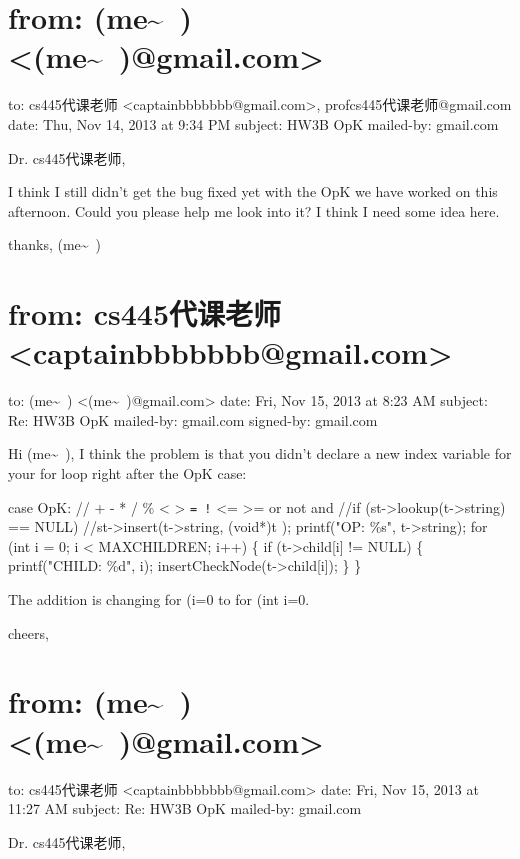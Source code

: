 \documentclass[12pt]{book}
\begin{document}
\section{from:         (me\textasciitilde{}~) <(me\textasciitilde{}~)@gmail.com>}
\label{sec-29-1}
to:         cs445代课老师 <captainbbbbbbb@gmail.com>,
 profcs445代课老师@gmail.com
date:         Thu, Nov 14, 2013 at 9:34 PM
subject:         HW3B OpK
mailed-by:         gmail.com

Dr. cs445代课老师, 

I think I still didn't get the bug fixed yet with the OpK we have worked on this afternoon. 
Could you please help me look into it? I think I need some idea here. 

thanks,
(me\textasciitilde{}~)

\section{from:         cs445代课老师 <captainbbbbbbb@gmail.com>}
\label{sec-29-2}
to:         (me\textasciitilde{}~) <(me\textasciitilde{}~)@gmail.com>
date:         Fri, Nov 15, 2013 at 8:23 AM
subject:         Re: HW3B OpK
mailed-by:         gmail.com
signed-by:         gmail.com

Hi (me\textasciitilde{}~),
             I think the problem is that you didn't declare a new index variable for your for loop 
right after the OpK case:

case OpK:  // + - * / \% < > \texttt{= !} <= >= or not and
            //if (st->lookup(t->string) == NULL)
            //st->insert(t->string, (void*)t );
            printf("OP: \%s\n", t->string);
            for (int i = 0; i < MAXCHILDREN; i++) \{
                if (t->child[i] != NULL) \{
                    printf("CHILD: \%d\n", i);
                    insertCheckNode(t->child[i]);
                \}
            \}

The addition is changing for (i=0 to for (int i=0.

cheers,

\section{from:         (me\textasciitilde{}~) <(me\textasciitilde{}~)@gmail.com>}
\label{sec-29-3}
to:         cs445代课老师 <captainbbbbbbb@gmail.com>
date:         Fri, Nov 15, 2013 at 11:27 AM
subject:         Re: HW3B OpK
mailed-by:         gmail.com

Dr. cs445代课老师, 
\end{document}
